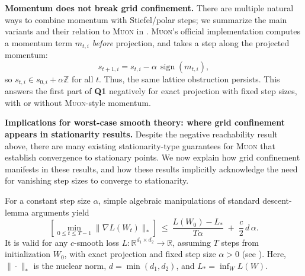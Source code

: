 \documentclass{article}
\theoremstyle{plain}
\theoremstyle{definition}
\theoremstyle{remark}
\newcommand{\R}{\mathbb{R}}
\newcommand{\Z}{\mathbb{Z}}
\newcommand{\loss}{L}
\newcommand{\stepsize}{\alpha}
\newcommand{\sign}{\operatorname{sign}}
\newcommand{\Lips}{{c}} %
\newcommand{\sv}{{s}} %
\newcommand{\Muon}{\textsc{Muon}}
\begin{document}
\textbf{Momentum does not break grid confinement.} 
There are multiple natural ways to combine momentum with Stiefel/polar steps; we summarize the main variants and their relation to \Muon{} in .
\Muon{}'s official implementation  
computes a momentum term $m_{t,i}$ \emph{before} projection,
and takes a step along the projected momentum:
\begin{equation}
  \sv_{t+1,i} = \sv_{t,i} - \stepsize\,\sign(m_{t,i}),
  \label{eq:momentum-sign-grid}
\end{equation}
so $\sv_{t,i}\in \sv_{0,i}+\stepsize\Z$ for all $t$.
Thus, the same lattice obstruction persists. 
This answers the first part of \textbf{Q1} negatively for exact projection with fixed step sizes, with or without \Muon{}-style momentum.

\textbf{Implications for worst-case smooth theory: 
where grid confinement appears in stationarity results.} 
Despite the negative reachability result above, 
there are many existing stationarity-type guarantees for \Muon{} 
that establish convergence to stationary points. 
We now explain how grid confinement manifests 
in these results, and how these results implicitly acknowledge
the need for vanishing step sizes to 
converge to stationarity. 

For a constant step size $\stepsize$, 
simple algebraic manipulations of standard descent-lemma arguments yield
\begin{equation}
  \left[ \min_{0\le t\le T-1}\|\nabla \loss(W_t)\|_\ast \right]
  \ \le\
  \frac{\loss(W_0)-\loss_\ast}{T\stepsize}
  \;+\;
  \frac{\Lips}{2}\,d\,\stepsize.
  \label{eq:stationarity-constant}
\end{equation}
It is valid for any $\Lips$-smooth loss $\loss \colon \R^{d_1\times d_2}\to\R$, 
assuming $T$ steps from initialization $W_0$, 
with exact projection and fixed step size $\stepsize>0$ (see ). 
Here, $\|\cdot\|_\ast$ is the nuclear norm, $d=\min(d_1,d_2)$, and $\loss_\ast=\inf_W \loss(W)$. 
\end{document}
